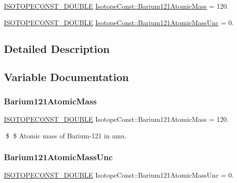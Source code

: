 \begin{DoxyCompactItemize}
\item 
\mbox{\hyperlink{group___isotope_const-_macros_ga8f45a7272ce02c0b4c65c44636ed719a}{I\+S\+O\+T\+O\+P\+E\+C\+O\+N\+S\+T\+\_\+\+D\+O\+U\+B\+LE}} \mbox{\hyperlink{group___isotope_const-_barium-_ba121_ga13e3a3636835ecc65d3d4d5afb69ce22}{Isotope\+Const\+::\+Barium121\+Atomic\+Mass}} = 120.
\item 
\mbox{\hyperlink{group___isotope_const-_macros_ga8f45a7272ce02c0b4c65c44636ed719a}{I\+S\+O\+T\+O\+P\+E\+C\+O\+N\+S\+T\+\_\+\+D\+O\+U\+B\+LE}} \mbox{\hyperlink{group___isotope_const-_barium-_ba121_gae70e49035104e7a075f1a1f51a073d1c}{Isotope\+Const\+::\+Barium121\+Atomic\+Mass\+Unc}} = 0.
\end{DoxyCompactItemize}


\subsection{Detailed Description}


\subsection{Variable Documentation}
\mbox{\label{group___isotope_const-_barium-_ba121_ga13e3a3636835ecc65d3d4d5afb69ce22}} 
\subsubsection{\texorpdfstring{Barium121\+Atomic\+Mass}{Barium121AtomicMass}}
{\footnotesize\ttfamily \mbox{\hyperlink{group___isotope_const-_macros_ga8f45a7272ce02c0b4c65c44636ed719a}{I\+S\+O\+T\+O\+P\+E\+C\+O\+N\+S\+T\+\_\+\+D\+O\+U\+B\+LE}} Isotope\+Const\+::\+Barium121\+Atomic\+Mass = 120.}

\$ \$ Atomic mass of Barium-\/121 in amu. \mbox{\label{group___isotope_const-_barium-_ba121_gae70e49035104e7a075f1a1f51a073d1c}} 
\subsubsection{\texorpdfstring{Barium121\+Atomic\+Mass\+Unc}{Barium121AtomicMassUnc}}
{\footnotesize\ttfamily \mbox{\hyperlink{group___isotope_const-_macros_ga8f45a7272ce02c0b4c65c44636ed719a}{I\+S\+O\+T\+O\+P\+E\+C\+O\+N\+S\+T\+\_\+\+D\+O\+U\+B\+LE}} Isotope\+Const\+::\+Barium121\+Atomic\+Mass\+Unc = 0.}

